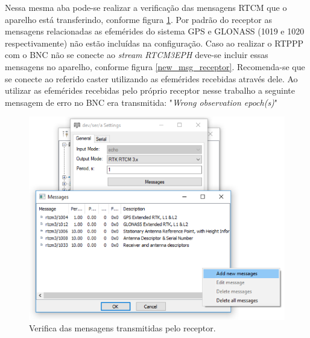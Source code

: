 Nessa mesma aba pode-se realizar a verificação das mensagens RTCM que o aparelho está transferindo, conforme figura \ref{msg_receptor}. Por padrão do receptor as mensagens relacionadas as efemérides do sistema GPS e GLONASS (1019 e 1020 respectivamente) não estão incluídas na configuração. Caso ao realizar o RTPPP com o BNC não se conecte ao \textit{stream} \textit{RTCM3EPH} deve-se incluir essas mensagens no aparelho, conforme figura \ref{new_msg_receptor}. Recomenda-se que se conecte ao referido caster utilizando as efemérides recebidas através dele. Ao utilizar as efemérides recebidas pelo próprio receptor nesse trabalho a seguinte mensagem de erro no BNC era transmitida: "\textit{Wrong observation epoch(s)}"

\begin{figure}[H]
\centering
\includegraphics[scale=0.5]{pfc_pdf_files/img/TRU_13_msg.png} %
\caption{Verifica das mensagens transmitidas pelo receptor.}
\label{msg_receptor}
\end{figure}

